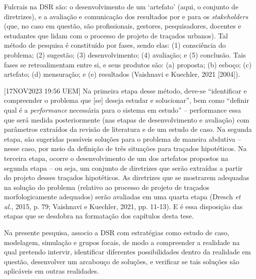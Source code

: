 \documentclass[12pt, a4paper]{book} %
\begin{document}
        Fulcrais na DSR são: o desenvolvimento de um `artefato' (aqui, o conjunto de diretrizes), e a avaliação e comunicação dos resultados por e para os \textit{stakeholders} (que, no caso em questão, são profissionais, gestores, pesquisadores, docentes e estudantes que lidam com o processo de projeto de traçados urbanos). Tal método de pesquisa é constituído por fases, sendo elas: (1) consciência do problema; (2) sugestão; (3) desenvolvimento; (4) avaliação; e (5) conclusão. Tais fases se retroalimentam entre si, e seus produtos são: (a) proposta; (b) esboço; (c) artefato; (d) mensuração; e (e) resultados (Vaishnavi e Kuechler, 2021 [2004]).

        [17NOV2023 19:56 UEM] Na primeira etapa desse método, deve-se ``identificar e compreender o problema que [se] deseja estudar e solucionar'', bem como ``definir qual é a \textit{performance} necessária para o sistema em estudo'' – performance essa que será medida posteriormente (nas etapas de desenvolvimento e avaliação) com parâmetros extraídos da revisão de literatura e de um estudo de caso. Na segunda etapa, são sugeridas possíveis soluções para o problema de maneira abdutiva – nesse caso, por meio da definição de três situações para traçados hipotéticos. Na terceira etapa, ocorre o desenvolvimento de um dos artefatos propostos na segunda etapa – ou seja, um conjunto de diretrizes que serão extraídas a partir do projeto desses traçados hipotéticos. As diretrizes que se mostrarem adequadas na solução do problema (relativo ao processo de projeto de traçados morfologicamente adequados) serão avaliadas em uma quarta etapa (Dresch \textit{et al.}, 2015, p. 79; Vaishnavi e Kuechler, 2021, pp. 11-13). E é essa disposição das etapas que se desdobra na formatação dos capítulos desta tese.

        Na presente pesquisa, associo a DSR com estratégias como estudo de caso, modelagem, simulação e grupos focais, de modo a compreender a realidade na qual pretendo intervir, identificar diferentes possibilidades dentro da realidade em questão, desenvolver um arcabouço de soluções, e verificar se tais soluções são aplicáveis em outras realidades.
\end{document}

